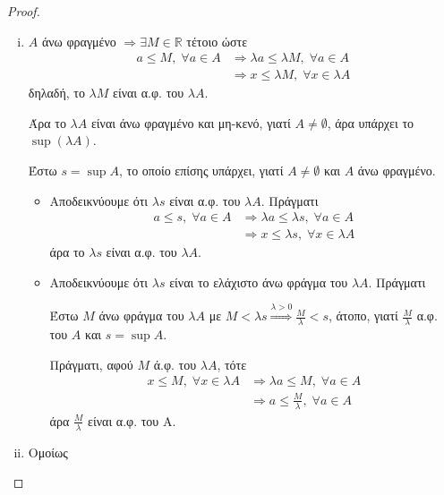 \documentclass[main.tex]{subfiles}
\begin{document}
\begin{proof}
\item {}
    \begin{enumerate}[i)]
        \item $A$ άνω φραγμένο $ \Rightarrow \exists M \in \mathbb{R} $ τέτοιο ώστε
            \begin{align*}
                a \leq M, \; \forall a \in A
                &\Rightarrow \lambda a \leq \lambda M, \; \forall a \in A \\
                & \Rightarrow x \leq \lambda M, \; \forall x \in \lambda A 
            \end{align*}
            δηλαδή, το  $ \lambda M $ είναι α.φ. του $ \lambda A $.

            Άρα το $ \lambda A $ είναι άνω φραγμένο και μη-κενό, γιατί $ A \neq 
            \emptyset $, άρα υπάρχει το $ \sup (\lambda A) $.

            Έστω $ s= \sup A $, το οποίο επίσης υπάρχει, γιατί $ A \neq \emptyset $ 
            και $A$ άνω φραγμένο. 

            \begin{itemize}
                \item Αποδεικνύουμε ότι $ \lambda s $ είναι α.φ. του $ \lambda A $. 
                    Πράγματι
                    \begin{align*}
                        a \leq s, \; \forall a \in A 
                        & \Rightarrow \lambda a \leq \lambda s, \; \forall a \in A \\
                        & \Rightarrow x \leq \lambda s, \; \forall x \in \lambda A
                    \end{align*}
                    άρα το $ \lambda s $ είναι α.φ. του $ \lambda A $.

                \item Αποδεικνύουμε ότι $ \lambda s $ είναι το ελάχιστο άνω φράγμα 
                    του $ \lambda A$.  Πράγματι 

                    Έστω $M$ άνω φράγμα του $ \lambda A $ με $ M < \lambda s 
                    \overset{\lambda >0} {\Rightarrow} \frac{M}{\lambda} < s  $, 
                    άτοπο, γιατί $ \frac{ M}{\lambda} $ α.φ. του $A$ και $ s= \sup A $.

                    Πράγματι, αφού $ M $ ά.φ. του $ \lambda A $, τότε
                    \begin{align*}
                        x \leq M, \; \forall x \in \lambda A 
            &\Rightarrow \lambda a \leq M, \; \forall a \in A \\
            &\Rightarrow a \leq \frac{M}{\lambda}, \; \forall a \in A
                    \end{align*} 
                    άρα $ \frac{M}{\lambda} $ είναι α.φ. του Α.
            \end{itemize}

        \item Ομοίως
    \end{enumerate}
\end{proof}
\end{document}
